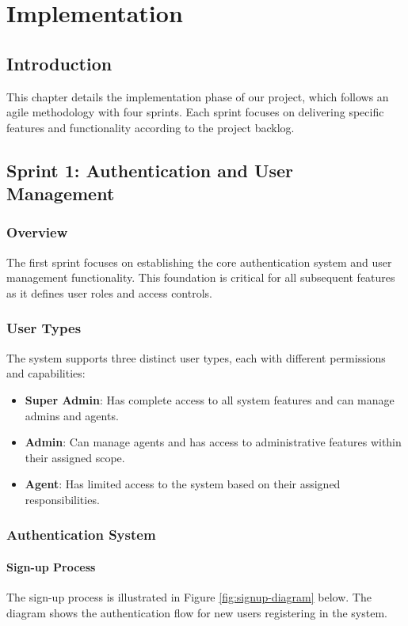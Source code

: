 \chapter{Implementation}

\section{Introduction}
This chapter details the implementation phase of our project, which follows an agile methodology with four sprints. Each sprint focuses on delivering specific features and functionality according to the project backlog.

\section{Sprint 1: Authentication and User Management}
\subsection{Overview}
The first sprint focuses on establishing the core authentication system and user management functionality. This foundation is critical for all subsequent features as it defines user roles and access controls.

\subsection{User Types}
The system supports three distinct user types, each with different permissions and capabilities:
\begin{itemize}
    \item \textbf{Super Admin}: Has complete access to all system features and can manage admins and agents.
    \item \textbf{Admin}: Can manage agents and has access to administrative features within their assigned scope.
    \item \textbf{Agent}: Has limited access to the system based on their assigned responsibilities.
\end{itemize}

\subsection{Authentication System}
\subsubsection{Sign-up Process}
The sign-up process is illustrated in Figure \ref{fig:signup-diagram} below. The diagram shows the authentication flow for new users registering in the system.

